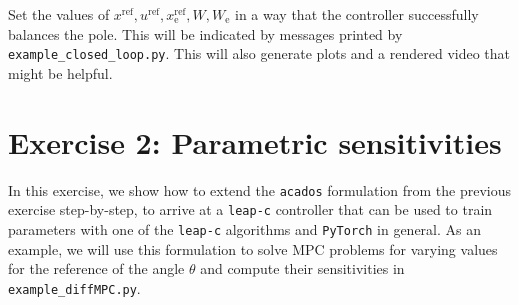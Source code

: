\documentclass{article}
\newcommand{\acados}{\texttt{acados}}
\newcommand{\leapc}{\texttt{leap-c}}
\begin{document}
\begin{enumerate}[label=1.\arabic*]
	Set the values of $x^{\mathrm{ref}}, u^{\mathrm{ref}}, x^{\mathrm{ref}}_{\mathrm{e}}, W, W_\mathrm{e}$ in a way that the controller successfully balances the pole.
	This will be indicated by messages printed by \verb*|example_closed_loop.py|.
	This will also generate plots and a rendered video that might be helpful.
\end{enumerate}


\section*{Exercise 2: Parametric sensitivities}
In this exercise, we show how to extend the \acados{} formulation from the previous exercise step-by-step,
to arrive at a \leapc{} controller that can be used to train parameters with one of the
\leapc{} algorithms and \texttt{PyTorch} in general. As an example, we will
use this formulation to solve MPC problems for varying values for the reference of the angle $\theta$
and compute their sensitivities in \verb*|example_diffMPC.py|.
\end{document}
